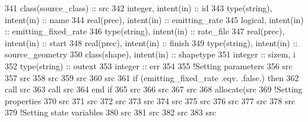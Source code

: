 \begin{DoxyCode}
341     \textcolor{keywordtype}{class}(source\_class) :: src
342     \textcolor{keywordtype}{integer}, \textcolor{keywordtype}{intent(in)} :: id
343     \textcolor{keywordtype}{type}(string), \textcolor{keywordtype}{intent(in)} :: name
344     \textcolor{keywordtype}{real(prec)}, \textcolor{keywordtype}{intent(in)} :: emitting\_rate
345     \textcolor{keywordtype}{logical}, \textcolor{keywordtype}{intent(in)} :: emitting\_fixed\_rate
346     \textcolor{keywordtype}{type}(string), \textcolor{keywordtype}{intent(in)} :: rate\_file
347     \textcolor{keywordtype}{real(prec)}, \textcolor{keywordtype}{intent(in)} :: start
348     \textcolor{keywordtype}{real(prec)}, \textcolor{keywordtype}{intent(in)} :: finish
349     \textcolor{keywordtype}{type}(string), \textcolor{keywordtype}{intent(in)} :: source\_geometry
350     \textcolor{keywordtype}{class}(shape), \textcolor{keywordtype}{intent(in)} :: shapetype
351     \textcolor{keywordtype}{integer} :: sizem, i
352     \textcolor{keywordtype}{type}(string) :: outext
353     \textcolor{keywordtype}{integer} :: err
354 
355     \textcolor{comment}{!Setting parameters}
356     src%
357     src%
358     src%
359     src%
360     src%
361     \textcolor{keywordflow}{if} (emitting\_fixed\_rate .eqv. .false.) \textcolor{keywordflow}{then}
362         \textcolor{keyword}{call }src%
363         \textcolor{keyword}{call }src%
364 \textcolor{keywordflow}{    end if}
365     src%
366     src%
367     src%
368     \textcolor{keyword}{allocate}(src%
369     \textcolor{comment}{!Setting properties}
370     src%
371     src%
372     src%
373     src%
374     src%
375     src%
376     src%
377     src%
378     src%
379     \textcolor{comment}{!Setting state variables}
380     src%
381     src%
382     src%
383     src%

\end{DoxyCode}
